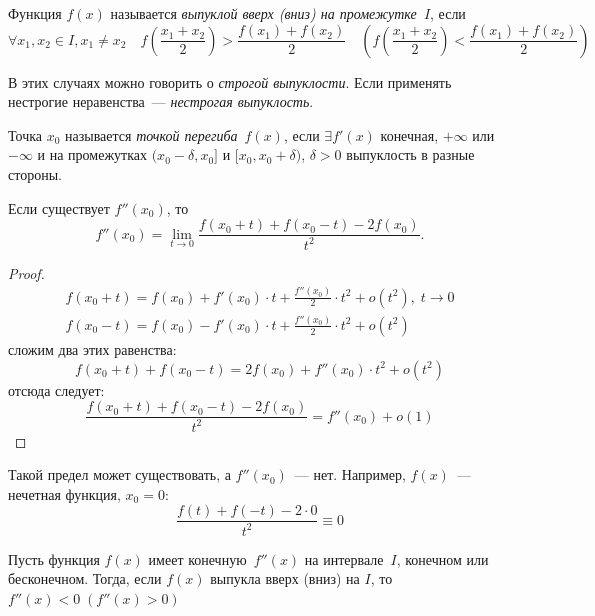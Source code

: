 \setcounter{section}{4}
\setcounter{subsection}{4}

\begin{definition}
Функция \(f(x)\) называется \textit{выпуклой вверх (вниз) на промежутке~\(I\)},
если
\[
    \forall x_1, x_2 \in I, x_1 \neq x_2 \quad f\left(\frac{x_1 + x_2}{2}
        \right) > \frac{f(x_1) + f(x_2)}{2} \quad \left(f\left(\frac{x_1 + x_2}
        {2}\right) < \frac{f(x_1) + f(x_2)}{2}\right)
\]
\end{definition}

В этих случаях можно говорить о \textit{строгой выпуклости}. Если применять
нестрогие неравенства~--- \textit{нестрогая выпуклость}.

\begin{definition}
Точка \(x_0\) называется \textit{точкой перегиба}~\(f(x)\), если \(\exists
f'(x)\) конечная, \(+\infty\) или \(-\infty\) и на промежутках \((x_0 - \delta,
x_0]\) и \([x_0, x_0 + \delta)\), \(\delta > 0\) выпуклость в разные стороны.
\end{definition}

\begin{statement}
Если существует \(f''(x_0)\), то
\[
    f''(x_0) = \lim_{t \rightarrow 0} \frac{f(x_0 + t) + f(x_0 - t) - 2f(x_0)}
        {t^2}.
\]
\end{statement}

\begin{proof}
\begin{gather}
    f(x_0 + t) = f(x_0) + f'(x_0) \cdot t + \frac{f''(x_0)}{2} \cdot t^2 +
        o(t^2), \; t \rightarrow 0\\
    f(x_0 - t) = f(x_0) - f'(x_0) \cdot t + \frac{f''(x_0)}{2} \cdot t^2 +
        o(t^2)
\end{gather}
сложим два этих равенства:
\[
    f(x_0 + t) + f(x_0 - t) = 2f(x_0) + f''(x_0) \cdot t^2 + o(t^2)
\]
отсюда следует:
\[
    \frac{f(x_0 + t) + f(x_0 - t) - 2f(x_0)}{t^2} = f''(x_0) + o(1)
\]
\end{proof}

\begin{note}
Такой предел может существовать, а \(f''(x_0)\)~--- нет. Например, \(f(x)\)~---
нечетная функция, \(x_0 = 0\):
\[
    \frac{f(t) + f(-t) - 2 \cdot 0}{t^2} \equiv 0
\]
\end{note}

\begin{theorem}
Пусть функция \(f(x)\) имеет конечную~\(f''(x)\) на интервале~\(I\), конечном
или бесконечном. Тогда, если \(f(x)\) выпукла вверх (вниз) на \(I\), то \(f''(x)
< 0 \; (f''(x) > 0)\)
\end{theorem}


